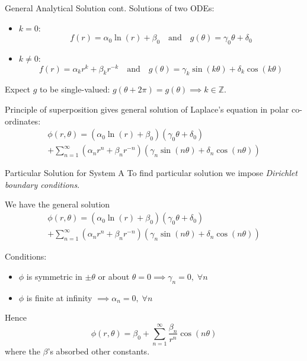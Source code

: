 \documentclass{beamer}
\newcommand{\be}{\begin{equation}}
\newcommand{\ee}{\end{equation}}
\begin{document}
\begin{frame}{General Analytical Solution cont.}
Solutions of two ODEs:
\begin{itemize}
\item $k=0$:
\be
f(r)=\alpha_0 \ln(r) + \beta_0  \quad \text{and} \quad g(\theta)=\gamma_0 \theta +\delta_0
\ee
\item $k \neq 0$:
\be
f(r)=\alpha_k r^k +\beta_k r^{-k} \quad \text{and} \quad g(\theta) = \gamma_k \sin(k\theta) +\delta_k \cos(k\theta)
\ee
\end{itemize}

Expect $g$ to be single-valued: $g(\theta+2\pi)=g(\theta) \implies k \in \mathbb{Z}$.

Principle of superposition gives general solution of Laplace's equation in polar
co-ordinates:
%
\begin{multline}
\phi(r, \theta) = (\alpha_0 \ln(r) + \beta_0)(\gamma_0\theta + \delta_0) \\
                + \sum_{n=1}^{\infty}(\alpha_n r^n+\beta_n r^{-n})(\gamma_n \sin(n\theta) + \delta_n \cos(n\theta))
\end{multline}

\end{frame}

\begin{frame}{Particular Solution for System A}
To find particular solution we impose \emph{Dirichlet boundary conditions}.

We have the general solution
%
\begin{multline}
\phi(r, \theta) = (\alpha_0 \ln(r) + \beta_0)(\gamma_0\theta + \delta_0) \\
                + \sum_{n=1}^{\infty}(\alpha_n r^n+\beta_n r^{-n})(\gamma_n \sin(n\theta) + \delta_n \cos(n\theta))
\end{multline}

Conditions:
\begin{itemize}
\item $\phi$ is symmetric in $\pm\theta$ or about $\theta=0 \implies \gamma_n=0, \; \forall n$
\item $\phi$ is finite at infinity $\implies \alpha_n=0, \; \forall n$
\end{itemize}

Hence
%
\be
\phi(r, \theta) = \beta_0 + \sum_{n=1}^{\infty} \frac{\beta_n}{r^n} \cos(n\theta)
\ee
%
where the $\beta$'s absorbed other constants.
\end{frame}
\end{document}

